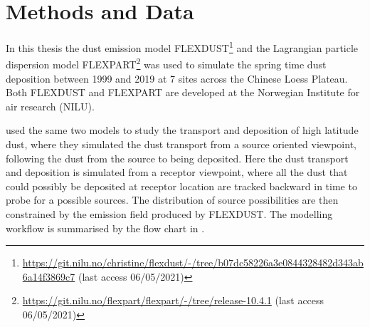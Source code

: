 \chapter{Methods and Data} 
In this thesis the dust emission model 
FLEXDUST\footnote{\url{https://git.nilu.no/christine/flexdust/-/tree/b07dc58226a3e0844328482d343ab6a14f3869c7} (last access 06/05/2021)} 
\parencite{flexdust_ref_2016} and the Lagrangian particle dispersion model 
FLEXPART\footnote{ \url{https://git.nilu.no/flexpart/flexpart/-/tree/release-10.4.1} (last access 06/05/2021)} 
\parencite{Flexpart10.4_ref} was used to 
simulate the spring time dust deposition between 1999 and 2019 at 7 sites across the Chinese Loess Plateau. Both FLEXDUST and FLEXPART are developed at the Norwegian Institute for air research (NILU). 

\textcite{flexdust_ref_2016} used the same two models to study the transport and deposition of high latitude dust, where they simulated the dust transport from a source oriented viewpoint, following the dust from the source to being deposited. Here the dust transport and deposition is simulated from a receptor viewpoint, where all the dust that could possibly be deposited at receptor location are tracked backward in time to probe for a possible sources. The distribution of source possibilities are then constrained by the emission field produced by FLEXDUST. The modelling workflow is summarised by the flow chart in . 

